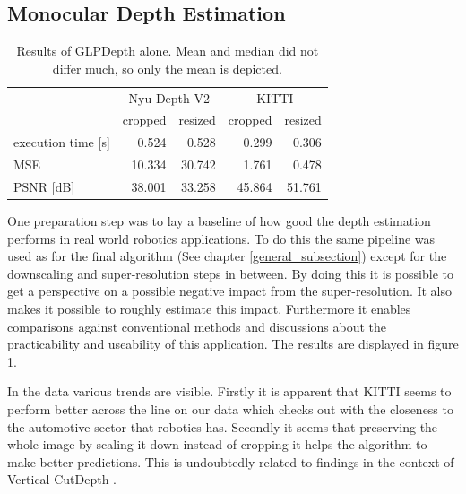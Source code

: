 \subsection{Monocular Depth Estimation}

\begin{table}[ht!]
    \begin{center}
        \begin{tabular}{ l | r r r r }
                                & \multicolumn{2}{c}{Nyu Depth V2}  & \multicolumn{2}{c}{KITTI} \\
                                & cropped   & resized               & cropped   & resized       \\
            \hline
            execution time [s]  & 0.524     & 0.528                 & 0.299     & 0.306         \\
            MSE                 & 10.334    & 30.742                & 1.761     & 0.478         \\
            PSNR [dB]           & 38.001    & 33.258                & 45.864    & 51.761        \\
        \end{tabular}
        \caption{Results of GLPDepth alone. Mean and median did not differ much, so only the mean is depicted.} \label{res_glpdepth}
    \end{center}
\end{table}

One preparation step was to lay a baseline of how good the depth estimation performs in real world robotics applications. To do this the same pipeline was used as for the final algorithm (See chapter \ref*{general_subsection}) except for the downscaling and super-resolution steps in between. By doing this it is possible to get a perspective on a possible negative impact from the super-resolution. It also makes it possible to roughly estimate this impact. Furthermore it enables comparisons against conventional methods and discussions about the practicability and useability of this application. The results are displayed in figure \ref*{res_glpdepth}.

In the data various trends are visible. Firstly it is apparent that KITTI seems to perform better across the line on our data which checks out with the closeness to the automotive sector that robotics has. Secondly it seems that preserving the whole image by scaling it down instead of cropping it helps the algorithm to make better predictions. This is undoubtedly related to findings in the context of Vertical CutDepth \cite{ishii}.

